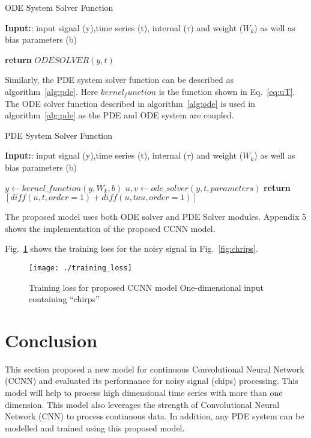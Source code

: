 \documentclass{article}
\begin{document}
\begin{algorithm}
	\caption{ODE System Solver Function}
	\renewcommand{\algorithmicrequire}{\textbf{Input:}}
	\algorithmicrequire: input signal (y),time series (t), internal ($\tau$) and  weight ($W_k$) as well as bias parameters (b)
	\begin{algorithmic}[1]
		    \State \textbf{return}  $ODESOLVER(y,t)$
		\EndProcedure
	\end{algorithmic}
\label{alg:ode}
\end{algorithm}

Similarly, the PDE system solver function can be described as algorithm~\ref{alg:pde}. Here $kernel_function$ is the function shown in Eq.~\eqref{eq:uT}. The ODE solver function described in algorithm~\ref{alg:ode} is used in algorithm~\ref{alg:pde} as the PDE and ODE system are coupled. 

\begin{algorithm}
	\caption{PDE System Solver Function}
	\renewcommand{\algorithmicrequire}{\textbf{Input:}}
	\algorithmicrequire: input signal (y),time series (t), internal ($\tau$) and  weight ($W_k$) as well as bias parameters (b)
	\begin{algorithmic}[1]
		    \State$y\gets kernel\_function(y, W_k, b)$
		    \State$u,v \gets ode\_solver(y,t,parameters)$
		    \State \textbf{return}  $[diff(u, t, order=1) + diff(u, tau, order=1)]$
		\EndProcedure
	\end{algorithmic}
\label{alg:pde}
\end{algorithm}

The proposed model uses both ODE solver and PDE Solver modules. Appendix 5 shows the implementation of the proposed CCNN model.

Fig.~\ref{fig:loss} shows the training loss for the noisy signal in Fig.~\ref{fig:chrips}.

\begin{figure}[htb]
    \centering
    \texttt{[image: ./training\_loss]}
    \caption{Training loss for proposed CCNN model One-dimensional input containing “chirps”}
    \label{fig:loss}
\end{figure}


\section*{Conclusion}
This section proposed a new model for continuous Convolutional Neural Network (CCNN) and evaluated its performance for noisy signal (chips) processing. This model will help to process high dimensional time series with more than one dimension. This model also leverages the strength of Convolutional Neural Network (CNN) to process continuous data. In addition, any PDE system can be modelled and trained using this proposed model. 
\clearpage

  
\end{document}
